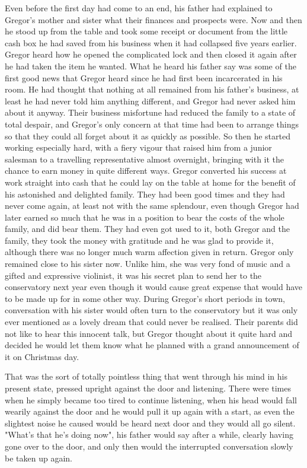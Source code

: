 Even before the first day had come to an end, his father had explained to Gregor's mother and sister what their finances and prospects were. Now and then he stood up from the table and took some receipt or document from the little cash box he had saved from his business when it had collapsed five years earlier. Gregor heard how he opened the complicated lock and then closed it again after he had taken the item he wanted. What he heard his father say was some of the first good news that Gregor heard since he had first been incarcerated in his room. He had thought that nothing at all remained from his father's business, at least he had never told him anything different, and Gregor had never asked him about it anyway. Their business misfortune had reduced the family to a state of total despair, and Gregor's only concern at that time had been to arrange things so that they could all forget about it as quickly as possible. So then he started working especially hard, with a fiery vigour that raised him from a junior salesman to a travelling representative almost overnight, bringing with it the chance to earn money in quite different ways. Gregor converted his success at work straight into cash that he could lay on the table at home for the benefit of his astonished and delighted family. They had been good times and they had never come again, at least not with the same splendour, even though Gregor had later earned so much that he was in a position to bear the costs of the whole family, and did bear them. They had even got used to it, both Gregor and the family, they took the money with gratitude and he was glad to provide it, although there was no longer much warm affection given in return. Gregor only remained close to his sister now. Unlike him, she was very fond of music and a gifted and expressive violinist, it was his secret plan to send her to the conservatory next year even though it would cause great expense that would have to be made up for in some other way. During Gregor's short periods in town, conversation with his sister would often turn to the conservatory but it was only ever mentioned as a lovely dream that could never be realised. Their parents did not like to hear this innocent talk, but Gregor thought about it quite hard and decided he would let them know what he planned with a grand announcement of it on Christmas day.

That was the sort of totally pointless thing that went through his mind in his present state, pressed upright against the door and listening. There were times when he simply became too tired to continue listening, when his head would fall wearily against the door and he would pull it up again with a start, as even the slightest noise he caused would be heard next door and they would all go silent. "What's that he's doing now", his father would say after a while, clearly having gone over to the door, and only then would the interrupted conversation slowly be taken up again.

